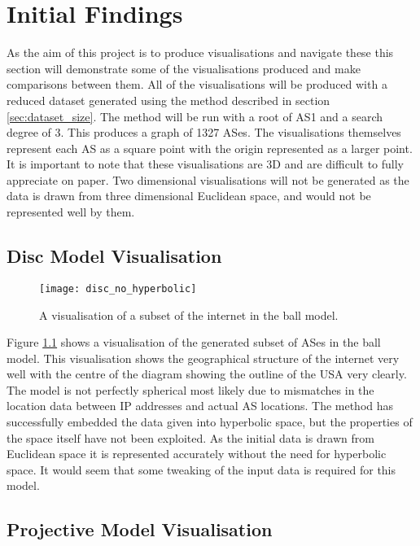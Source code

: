 \chapter{Initial Findings}
As the aim of this project is to produce visualisations and navigate these this section will demonstrate some of the visualisations produced and make comparisons between them. All of the visualisations will be produced with a reduced dataset generated using the method described in section \ref{sec:dataset_size}. The method will be run with a root of AS1 and a search degree of 3. This produces a graph of 1327 ASes. The visualisations themselves represent each AS as a square point with the origin represented as a larger point.  It is important to note that these visualisations are 3D and are difficult to fully appreciate on paper. Two dimensional visualisations will not be generated as the data is drawn from three dimensional Euclidean space, and would not be represented well by them.

\section{Disc Model Visualisation}

\begin{figure}
	\label{fig:disc_no_hyperbolic}
	\centering
	\texttt{[image: disc\_no\_hyperbolic]}
	\caption{A visualisation of a subset of the internet in the ball model.}
\end{figure}

Figure \ref{fig:disc_no_hyperbolic} shows a visualisation of the generated subset of ASes in the ball model. This visualisation shows the geographical structure of the internet very well with the centre of the diagram showing the outline of the USA very clearly. The model is not perfectly spherical most likely due to mismatches in the location data between IP addresses and actual AS locations. The method has successfully embedded the data given into hyperbolic space, but the properties of the space itself have not been exploited. As the initial data is drawn from Euclidean space it is represented accurately without the need for hyperbolic space. It would seem that some tweaking of the input data is required for this model.

\section{Projective Model Visualisation}

